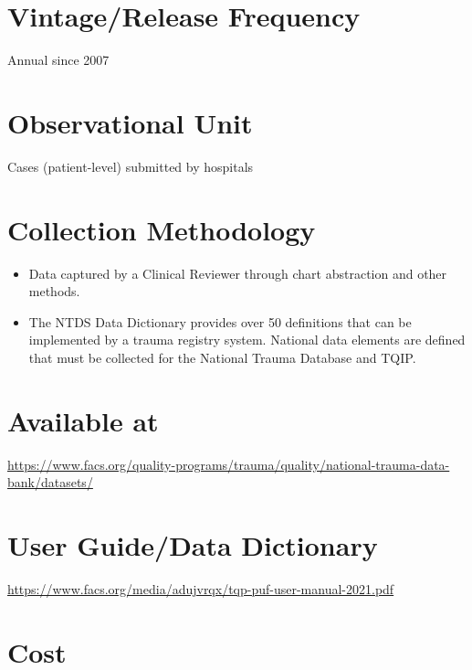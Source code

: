 \documentclass[
]{book}
\providecommand{\tightlist}{%
  \setlength{\itemsep}{0pt}\setlength{\parskip}{0pt}}
\begin{document}
\hypertarget{vintagerelease-frequency-3}{%
\section{Vintage/Release Frequency}\label{vintagerelease-frequency-3}}

Annual since 2007

\hypertarget{observational-unit-3}{%
\section{Observational Unit}\label{observational-unit-3}}

Cases (patient-level) submitted by hospitals

\hypertarget{collection-methodology-3}{%
\section{Collection Methodology}\label{collection-methodology-3}}

\begin{itemize}
\tightlist
\item
  Data captured by a Clinical Reviewer through chart abstraction and other methods.
\item
  The NTDS Data Dictionary provides over 50 definitions that can be implemented by a trauma registry system. National data elements are defined that must be collected for the National Trauma Database and TQIP.
\end{itemize}

\hypertarget{available-at-3}{%
\section{Available at}\label{available-at-3}}

\url{https://www.facs.org/quality-programs/trauma/quality/national-trauma-data-bank/datasets/}

\hypertarget{user-guidedata-dictionary-3}{%
\section{User Guide/Data Dictionary}\label{user-guidedata-dictionary-3}}

\url{https://www.facs.org/media/adujvrqx/tqp-puf-user-manual-2021.pdf}

\hypertarget{cost-3}{%
\section{Cost}\label{cost-3}}
\end{document}
